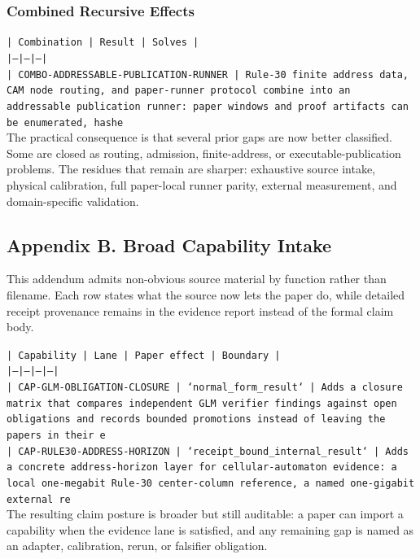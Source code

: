 \documentclass[11pt]{article}
\begin{document}
\subsubsection*{Combined Recursive Effects}

\noindent\texttt{| Combination | Result | Solves |}\\
\noindent\texttt{|---|---|---|}\\
\noindent\texttt{| COMBO-ADDRESSABLE-PUBLICATION-RUNNER | Rule-30 finite address data, CAM node routing, and paper-runner protocol combine into an addressable publication runner: paper windows and proof artifacts can be enumerated, hashe}\\

The practical consequence is that several prior gaps are now better classified. Some are closed as routing, admission, finite-address, or executable-publication problems. The residues that remain are sharper: exhaustive source intake, physical calibration, full paper-local runner parity, external measurement, and domain-specific validation.

\subsection*{Appendix B. Broad Capability Intake}

This addendum admits non-obvious source material by function rather than filename. Each row states what the source now lets the paper do, while detailed receipt provenance remains in the evidence report instead of the formal claim body.

\noindent\texttt{| Capability | Lane | Paper effect | Boundary |}\\
\noindent\texttt{|---|---|---|---|}\\
\noindent\texttt{| CAP-GLM-OBLIGATION-CLOSURE | `normal\_form\_result` | Adds a closure matrix that compares independent GLM verifier findings against open obligations and records bounded promotions instead of leaving the papers in their e}\\
\noindent\texttt{| CAP-RULE30-ADDRESS-HORIZON | `receipt\_bound\_internal\_result` | Adds a concrete address-horizon layer for cellular-automaton evidence: a local one-megabit Rule-30 center-column reference, a named one-gigabit external re}\\

The resulting claim posture is broader but still auditable: a paper can import a capability when the evidence lane is satisfied, and any remaining gap is named as an adapter, calibration, rerun, or falsifier obligation.
\end{document}
